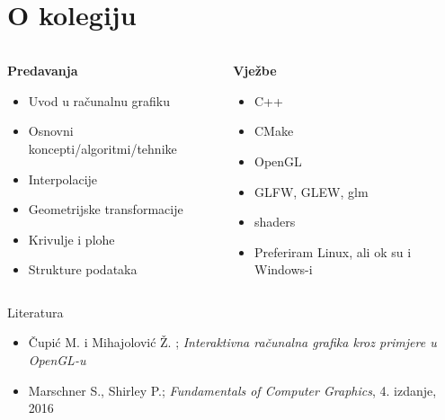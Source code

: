 \documentclass[9pt]{beamer}
\begin{document}
\section{O kolegiju}
\begin{frame}
	\begin{columns}[t]
		
		
		\begin{column}{0.4 \textwidth}
			\textbf{Predavanja}
				\begin{itemize}
				\item Uvod u računalnu grafiku
				\item Osnovni koncepti/algoritmi/tehnike
				\item Interpolacije
				\item Geometrijske transformacije
				\item Krivulje i plohe
				\item Strukture podataka
			\end{itemize}
		\end{column}

		
		\begin{column}{0.4 \textwidth}
			\textbf{Vježbe}
		\begin{itemize}
			\item C++
			\item CMake
			\item OpenGL
			\item GLFW, GLEW, glm
			\item shaders
			\item Preferiram Linux, ali ok su i Windows-i
		\end{itemize}
	\end{column}
	\end{columns}
\end{frame}

\begin{frame}{Literatura}
	\begin{itemize}
		\item Čupić M. i Mihajolović Ž. ; \textit{Interaktivna računalna grafika kroz primjere u OpenGL-u}
		\item Marschner S., Shirley P.; \textit{Fundamentals of Computer Graphics}, 4. izdanje, 2016
	\end{itemize}
\end{frame}
\end{document}
